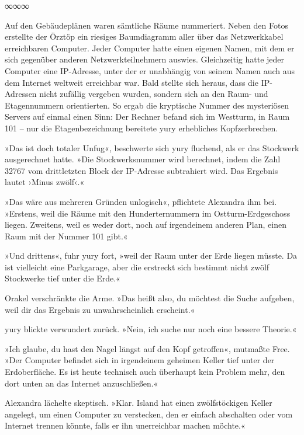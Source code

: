 \begin{center}
	∞∞∞
\end{center}

Auf den Gebäudeplänen waren sämtliche Räume nummeriert. Neben den Fotos erstellte der Örztöp ein riesiges Baumdiagramm aller über das Netzwerkkabel erreichbaren Computer. Jeder Computer hatte einen eigenen Namen, mit dem er sich gegenüber anderen Netzwerkteilnehmern auswies. Gleichzeitig hatte jeder Computer eine IP-Adresse, unter der er unabhängig von seinem Namen auch aus dem Internet weltweit erreichbar war. Bald stellte sich heraus, dass die IP-Adressen nicht zufällig vergeben wurden, sondern sich an den Raum- und Etagennummern orientierten. So ergab die kryptische Nummer des mysteriösen Servers auf einmal einen Sinn: Der Rechner befand sich im Westturm, in Raum 101 – nur die Etagenbezeichnung bereitete yury erhebliches Kopfzerbrechen.

»Das ist doch totaler Unfug«, beschwerte sich yury fluchend, als er das Stockwerk ausgerechnet hatte. »Die Stockwerksnummer wird berechnet, indem die Zahl 32767 vom drittletzten Block der IP-Adresse subtrahiert wird. Das Ergebnis lautet ›Minus zwölf‹.«

»Das wäre aus mehreren Gründen unlogisch«, pflichtete Alexandra ihm bei. »Erstens, weil die Räume mit den Hunderternummern im Ostturm-Erdgeschoss liegen. Zweitens, weil es weder dort, noch auf irgendeinem anderen Plan, einen Raum mit der Nummer 101 gibt.«

»Und drittens«, fuhr yury fort, »weil der Raum unter der Erde liegen müsste. Da ist vielleicht eine Parkgarage, aber die erstreckt sich bestimmt nicht zwölf Stockwerke tief unter die Erde.«

Orakel verschränkte die Arme. »Das heißt also, du möchtest die Suche aufgeben, weil dir das Ergebnis zu unwahrscheinlich erscheint.«

yury blickte verwundert zurück. »Nein, ich suche nur noch eine bessere Theorie.«

»Ich glaube, du hast den Nagel längst auf den Kopf getroffen«, mutmaßte Free. »Der Computer befindet sich in irgendeinem geheimen Keller tief unter der Erdoberfläche. Es ist heute technisch auch überhaupt kein Problem mehr, den dort unten an das Internet anzuschließen.«

Alexandra lächelte skeptisch. »Klar. Island hat einen zwölfstöckigen Keller angelegt, um einen Computer zu verstecken, den er einfach abschalten oder vom Internet trennen könnte, falls er ihn unerreichbar machen möchte.«

